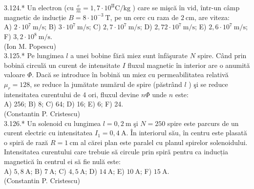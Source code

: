 \documentclass[10pt]{article}
\begin{document}
3.124.* Un electron (cu $\frac{e}{m}=1,7 \cdot 10^{\mathrm{II}} \mathrm{C} / \mathrm{kg}$ ) care se mişcă în vid, într-un câmp magnetic de inducție $B=8 \cdot 10^{-3} \mathrm{~T}$, pe un cerc cu raza de $2 \mathrm{~cm}$, are viteza:\\ A) $2 \cdot 10^{7} \mathrm{~m} / \mathrm{s}$; B) $3 \cdot 10^{7} \mathrm{~m} / \mathrm{s}$; C) $2,7 \cdot 10^{7} \mathrm{~m} / \mathrm{s}$; D) $2,72 \cdot 10^{7} \mathrm{~m} / \mathrm{s}$; E) $2,6 \cdot 10^{7} \mathrm{~m} / \mathrm{s}$; F) $3,2 \cdot 10^{8} \mathrm{~m} / \mathrm{s}$.\\ (Ion M. Popescu)\\

3.125.* Pe lungimea $l$ a unei bobine fără miez sunt înfäşurate $N$ spire. Când prin bobină circulă un curent de intensitate $I$ fluxul magnetic în interior are o anumită valoare $\Phi$. Dacă se introduce în bobină un miez cu permeabilitatea relativă $\mu_{r}=128$, se reduce la jumătate numărul de spire (păstrând $l$ ) şi se reduce intensitatea curentului de 4 ori, fluxul devine $n \Phi$ unde $n$ este:\\ A) 256; B) 8; C) 64; D) 16; E) 6; F) 24.\\ (Constantin P. Cristescu)\\

3.126.* Un solenoid cu lungimea $l=0,2 \mathrm{~m}$ şi $N=250$ spire este parcurs de un curent electric cu intensitatea $I_{1}=0,4 \mathrm{~A}$. În interiorul său, în centru este plasată o spiră de rază $R=1 \mathrm{~cm}$ al cărei plan este paralel cu planul spirelor solenoidului. Intensitatea curentului care trebuie să circule prin spiră pentru ca inducția magnetică în centrul ei să fie nulă este:\\ A) $5,8 \mathrm{~A}$; B) $7 \mathrm{~A}$; C) $4,5 \mathrm{~A}$; D) $14 \mathrm{~A}$; E) $10 \mathrm{~A}$; F) $15 \mathrm{~A}$.\\ (Constantin P. Cristescu)\\
\end{document}
